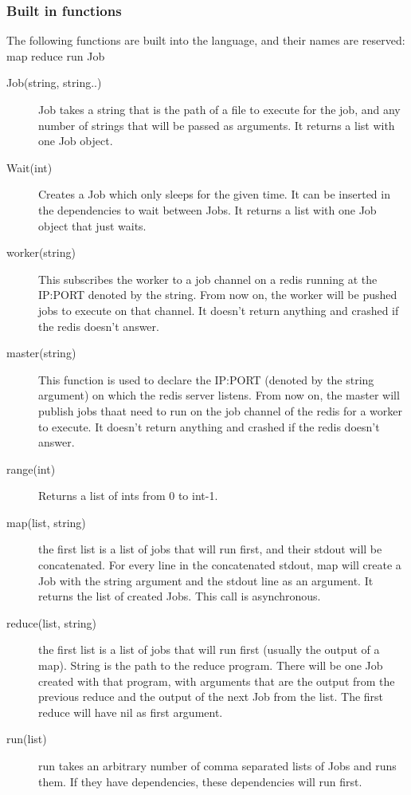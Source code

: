 \documentclass[12pt]{article}
\begin{document}
\subsubsection{Built in functions}
The following functions are built into the language, and their names are reserved:\\
map reduce run Job\\
\begin{description}
  \item[Job(string, string..)] Job takes a string that is the path of a file to
    execute for the job, and any number of strings that will be passed as
    arguments. It returns a list with one Job object.
  \item[Wait(int)] Creates a Job which only sleeps for the given time. It can be inserted
  in the dependencies to wait between Jobs. It returns a list with one Job object that just
  waits.
  \item[worker(string)] This subscribes the worker to a job channel on a redis running at
    the IP:PORT denoted by the string. From now on, the worker will be pushed jobs to
    execute on that channel. It doesn't return anything and crashed if the redis doesn't
    answer.
  \item[master(string)] This function is used to declare
    the IP:PORT (denoted by the string argument) on which the redis server listens.
    From now on, the master will publish jobs thaat need to run on the job channel of the redis
    for a worker to execute. It doesn't return anything and crashed if the redis doesn't
    answer.
  \item[range(int)] Returns a list of ints from 0 to int-1.
  \item[map(list, string)] the first list is a list of jobs that will run first, and their
    stdout will be concatenated. For every line in the concatenated stdout, map will create
    a Job with the string argument and the stdout line as an argument. It returns the list
    of created Jobs. This call is asynchronous.
  \item[reduce(list, string)] the first list is a list of jobs that will run first (usually the
    output of a map). String is the path to the reduce program. There will be one Job
    created with that program, with arguments that are the output from the previous reduce and
    the output of the next Job from the list. The first reduce will have nil as first argument.
  \item[run(list)] run takes an arbitrary number of comma separated lists of Jobs
    and runs them. If they have dependencies, these dependencies will run first.
\end{description}
\end{document}
